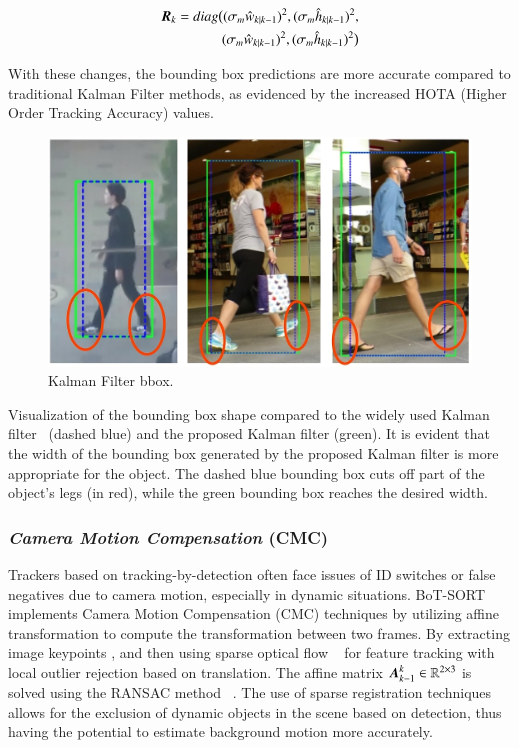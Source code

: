 \begin{equation}
  \begin{split}
      \vb*{R}_k = diag\big{(}(\sigma_{m} \hat{w}_{k|k-1})^2, (\sigma_{m} \hat{h}_{k|k-1})^2, \\
      (\sigma_{m} \hat{w}_{k|k-1})^2, (\sigma_{m} \hat{h}_{k|k-1})^2\big{)} 
  \end{split}
\end{equation}

With these changes, the bounding box predictions are more accurate compared to traditional Kalman Filter methods, as evidenced by the increased HOTA (Higher Order Tracking Accuracy) values.

\begin{figure}[H]
  \centering
  \includegraphics[scale=0.19]{gambar/KF_width.png}
  \caption{Kalman Filter bbox.}
  \label{fig:KF width}
\end{figure}

Visualization of the bounding box shape compared to the widely used Kalman filter~\cite{wojke2017simple} (dashed blue) and the proposed Kalman filter (green). It is evident that the width of the bounding box generated by the proposed Kalman filter is more appropriate for the object. The dashed blue bounding box cuts off part of the object's legs (in red), while the green bounding box reaches the desired width.

\vspace{5pt}
\subsubsection{\emph{Camera Motion Compensation} (CMC)}
\label{subsubsec:Camera Motion Compensation}

Trackers based on tracking-by-detection often face issues of ID switches or false negatives due to camera motion, especially in dynamic situations. BoT-SORT implements Camera Motion Compensation (CMC) techniques by utilizing affine transformation to compute the transformation between two frames. By extracting image keypoints \cite{shi1994good}, and then using sparse optical flow ~\cite{Bouguet1999PyramidalIO} for feature tracking with local outlier rejection based on translation. The affine matrix $\vb*{A}_{k-1}^k\in \mathbb{R}^{2 \times 3}$ is solved using the RANSAC method ~\cite{fischler1981random}. The use of sparse registration techniques allows for the exclusion of dynamic objects in the scene based on detection, thus having the potential to estimate background motion more accurately.

